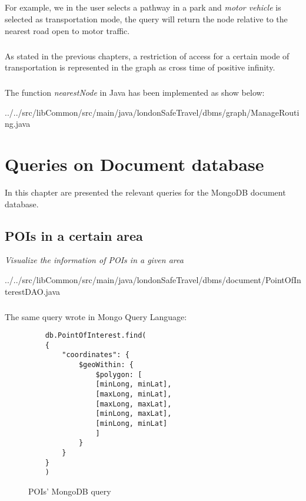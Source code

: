 \paragraph{}
For example, we in the user selects a pathway in a park and \textit{motor vehicle} is selected as transportation mode, the query will return the node relative to the nearest road open to motor traffic.

\paragraph{}
As stated in the previous chapters, a restriction of access for a certain mode of transportation is represented in the graph as cross time of positive infinity.

\paragraph{}
The function \textit{nearestNode} in Java has been implemented as show below:

{../../src/libCommon/src/main/java/londonSafeTravel/dbms/graph/ManageRouting.java}

\chapter{Queries on Document database}
In this chapter are presented the relevant queries for the
MongoDB document database.

\section{POIs in a certain area}
\textit{Visualize the information of POIs in a given area}


{../../src/libCommon/src/main/java/londonSafeTravel/dbms/document/PointOfInterestDAO.java}

\paragraph{}
The same query wrote in Mongo Query Language:
\begin{figure}[H]
\begin{lstlisting}
	db.PointOfInterest.find(
	{
		"coordinates": {
			$geoWithin: {
				$polygon: [
				[minLong, minLat],
				[maxLong, minLat],
				[maxLong, maxLat],
				[minLong, maxLat],
				[minLong, minLat]
				]
			}
		}
	}
	)
\end{lstlisting}
\caption{POIs' MongoDB query}
\end{figure}

